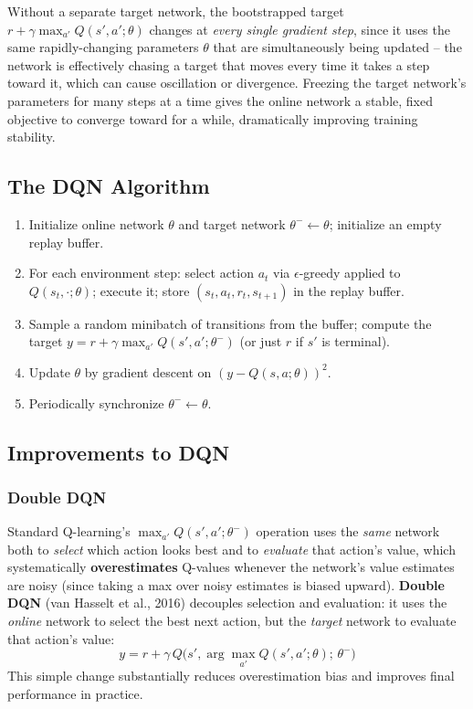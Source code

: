 \documentclass[12pt,a4paper]{article}
\begin{document}
\begin{keyidea}
Without a separate target network, the bootstrapped target $r + \gamma\max_{a'}Q(s',a';\theta)$ changes at \emph{every single gradient step}, since it uses the same rapidly-changing parameters $\theta$ that are simultaneously being updated -- the network is effectively chasing a target that moves every time it takes a step toward it, which can cause oscillation or divergence. Freezing the target network's parameters for many steps at a time gives the online network a stable, fixed objective to converge toward for a while, dramatically improving training stability.
\end{keyidea}

\subsection{The DQN Algorithm}

\begin{enumerate}[leftmargin=1.5em]
    \item Initialize online network $\theta$ and target network $\theta^- \leftarrow \theta$; initialize an empty replay buffer.
    \item For each environment step: select action $a_t$ via $\epsilon$-greedy applied to $Q(s_t,\cdot;\theta)$; execute it; store $(s_t,a_t,r_t,s_{t+1})$ in the replay buffer.
    \item Sample a random minibatch of transitions from the buffer; compute the target $y = r + \gamma\max_{a'}Q(s',a';\theta^-)$ (or just $r$ if $s'$ is terminal).
    \item Update $\theta$ by gradient descent on $(y - Q(s,a;\theta))^2$.
    \item Periodically synchronize $\theta^- \leftarrow \theta$.
\end{enumerate}

\subsection{Improvements to DQN}

\subsubsection{Double DQN}

\begin{keyidea}
Standard Q-learning's $\max_{a'} Q(s',a';\theta^-)$ operation uses the \emph{same} network both to \emph{select} which action looks best and to \emph{evaluate} that action's value, which systematically \textbf{overestimates} Q-values whenever the network's value estimates are noisy (since taking a max over noisy estimates is biased upward). \textbf{Double DQN} (van Hasselt et al., 2016) decouples selection and evaluation: it uses the \emph{online} network to select the best next action, but the \emph{target} network to evaluate that action's value:
\[
y = r + \gamma\, Q\big(s', \arg\max_{a'} Q(s',a';\theta);\, \theta^-\big)
\]
This simple change substantially reduces overestimation bias and improves final performance in practice.
\end{keyidea}
\end{document}
